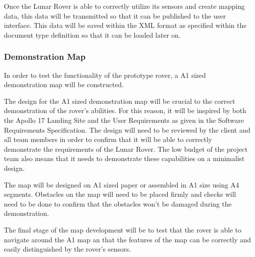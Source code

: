 \documentclass{article}
\newcounter{subsubsubsection}[subsubsection]
\begin{document}
    \begin{adjustwidth}{3em}{0pt}
    Once the Lunar Rover is able to correctly utilize its sensors and create mapping data, this data will be transmitted so that it can be published to the user interface. This data will be saved within the XML format as specified within the document type definition so that it can be loaded later on.
    \end{adjustwidth}
    
\subsubsection{Demonstration Map}
\begin{adjustwidth}{2em}{0pt}
In order to test the functionality of the prototype rover, a  A1 sized demonstration map will be constructed.
    \end{adjustwidth}
    
\begin{adjustwidth}{3em}{0pt}
The design for the A1 sized demonstration map will be crucial to the correct demonstration of the rover's abilities. For this reason, it will be inspired by both the Apollo 17 Landing Site and the User Requirements as given in the Software Requirements Specification. The design will need to be reviewed by the client and all team members in order to confirm that it will be able to correctly demonstrate the requirements of the Lunar Rover. The low budget of the project team also means that it needs to demonstrate these capabilities on a minimalist design.
\end{adjustwidth}

\begin{adjustwidth}{3em}{0pt}
The map will be designed on A1 sized paper or assembled in A1 size using A4 segments. Obstacles on the map will need to be placed firmly and checks will need to be done to confirm that the obstacles won't be damaged during the demonstration.
\end{adjustwidth}

\begin{adjustwidth}{3em}{0pt}
The final stage of the map development will be to test that the rover is able to navigate around the A1 map an that the features of the map can be correctly and easily distinguished by the rover's sensors.
\end{adjustwidth}
\end{document}
